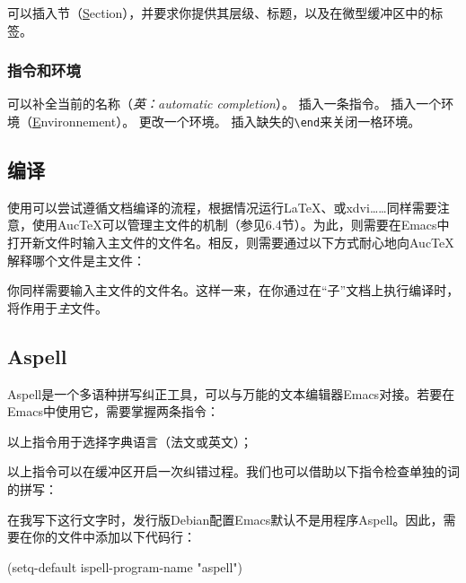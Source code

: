 可以插入节（\underline{S}ection），并要求你提供其层级、标题，以及在微型缓冲区中的标签。%

\subsubsection{指令和环境}

可以补全当前的名称（\emph{英：automatic completion}）。
插入一条指令。
插入一个环境（\underline{E}nvironnement）。
更改一个环境。
\fbox{\dm{C-c ]}}插入缺失的\verb+\end+来关闭一格环境。

\subsection{编译}

使用可以尝试遵循文档编译的流程，根据情况运行\LaTeX 、\bib 或\textsf{xdvi}……同样需要注意，使用Auc\TeX 可以管理主文件的机制（参见6.4节）。为此，则需要在\textsf{Emacs}中打开新文件时输入主文件的文件名。相反，则需要通过以下方式耐心地向Auc\TeX 解释哪个文件是主文件：


你同样需要输入主文件的文件名。这样一来，在你通过在“子”文档上执行编译时，将作用于\emph{主}文件。

\subsection{Aspell}

\textsf{Aspell}是一个多语种拼写纠正工具，可以与万能的文本编辑器\textsf{Emacs}对接。若要在\textsf{Emacs}中使用它，需要掌握两条指令：


以上指令用于选择字典语言（法文或英文）；


以上指令可以在缓冲区开启一次纠错过程。我们也可以借助以下指令检查单独的词的拼写：


\begin{exclamation}
在我写下这行文字时，发行版Debian配置Emacs默认不是用程序Aspell。因此，需要在你的文件中添加以下代码行：

\begin{dmd}
(setq-default ispell-program-name "aspell")
\end{dmd}
\end{exclamation}

